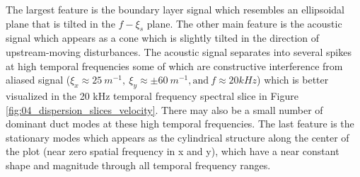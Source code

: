 The largest feature is the boundary layer signal which resembles an ellipsoidal plane that is tilted in the $f-\xi_s$ plane.
The other main feature is the acoustic signal which appears as a cone which is slightly tilted in the direction of upstream-moving disturbances.
The acoustic signal separates into several spikes at high temporal frequencies some of which are constructive interference from aliased signal ($\xi_x\approx25\ m^{-1},\ \xi_y\approx\pm60\ m^{-1}, \textrm{and}\ f\approx20 kHz$) which is better visualized in the 20 kHz temporal frequency spectral slice in Figure \ref{fig:04_dispersion_slices_velocity}.
There may also be a small number of dominant duct modes at these high temporal frequencies.
The last feature is the stationary modes which appears as the cylindrical structure along the center of the plot (near zero spatial frequency in x and y), which have a near constant shape and magnitude through all temporal frequency ranges.

